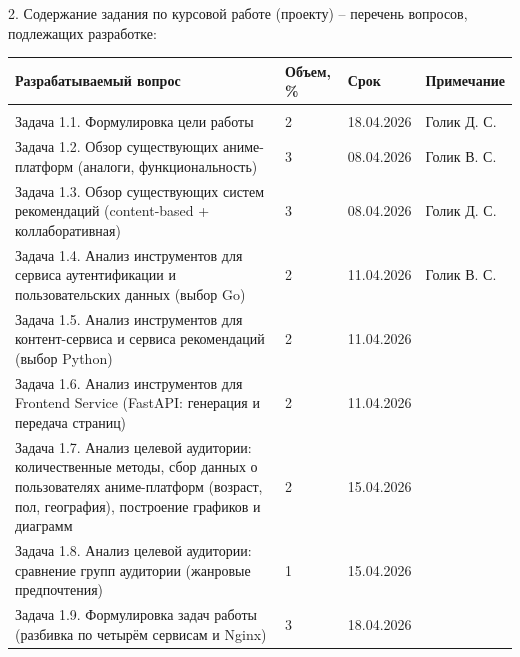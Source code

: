 \documentclass[14pt, a4paper]{extarticle}
\begin{document}
2. Содержание задания по курсовой работе (проекту) -- перечень вопросов,
подлежащих разработке:


{
\renewcommand{\arraystretch}{1.2}
\small
\begin{longtable}{|P{0.5\textwidth}|C{0.11\textwidth}|C{0.15\textwidth}|C{0.24\textwidth}|}

    \hline
    \textbf{Разрабатываемый вопрос} & \textbf{Объем, \%} & \textbf{Срок} & \textbf{Примечание} \\
    \hline
    \endhead
    \hline
    \endfoot

     \\ \hline
    Задача 1.1. Формулировка цели работы & 2 & 18.04.2026 &  Голик Д. С. \\ \hline
    Задача 1.2. Обзор существующих аниме-платформ (аналоги, функциональность) & 3 & 08.04.2026 &  Голик В. С.\\ \hline
    Задача 1.3. Обзор существующих систем рекомендаций (content-based + коллаборативная) & 3 & 08.04.2026 &  Голик Д. С.\\ \hline
    Задача 1.4. Анализ инструментов для сервиса аутентификации и пользовательских данных (выбор Go) & 2 & 11.04.2026 &  Голик В. С. \\ \hline
    Задача 1.5. Анализ инструментов для контент-сервиса и сервиса рекомендаций (выбор Python) & 2 & 11.04.2026 &  \\ \hline
    Задача 1.6. Анализ инструментов для Frontend Service (FastAPI: генерация и передача страниц) & 2 & 11.04.2026 &  \\ \hline
    Задача 1.7. Анализ целевой аудитории: количественные методы, сбор данных о пользователях аниме-платформ (возраст, пол, география), построение графиков и диаграмм & 2 & 15.04.2026 &  \\ \hline
    Задача 1.8. Анализ целевой аудитории: сравнение групп аудитории (жанровые предпочтения) & 1 & 15.04.2026 &  \\ \hline
    Задача 1.9. Формулировка задач работы (разбивка по четырём сервисам и Nginx) & 3 & 18.04.2026 &  \\ \hline


\end{longtable}}
\end{document}
